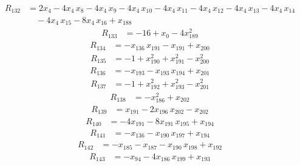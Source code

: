 \begin{align*}
R_{132} &= 2x_{4} -4x_{4}\,x_{8} -4x_{4}\,x_{9} -4x_{4}\,x_{10} -4x_{4}\,x_{11} -4x_{4}\,x_{12} -4x_{4}\,x_{13} -4x_{4}\,x_{14} \\
&\quad {} -4x_{4}\,x_{15} -8x_{4}\,x_{16} +x_{188}
\end{align*}
\begin{align*}
R_{133} &= -16 +x_{0} -4x_{189}^{2}
\end{align*}
\begin{align*}
R_{134} &= -x_{136}\,x_{191} -x_{191} +x_{200}
\end{align*}
\begin{align*}
R_{135} &= -1 +x_{190}^{2} +x_{191}^{2} -x_{200}^{2}
\end{align*}
\begin{align*}
R_{136} &= -x_{193} -x_{193}\,x_{194} +x_{201}
\end{align*}
\begin{align*}
R_{137} &= -1 +x_{192}^{2} +x_{193}^{2} -x_{201}^{2}
\end{align*}
\begin{align*}
R_{138} &= -x_{186}^{2} +x_{202}
\end{align*}
\begin{align*}
R_{139} &= x_{191} -2x_{196}\,x_{202} -x_{202}
\end{align*}
\begin{align*}
R_{140} &= -4x_{191} -8x_{191}\,x_{195} +x_{194}
\end{align*}
\begin{align*}
R_{141} &= -x_{136} -x_{190}\,x_{197} +x_{194}
\end{align*}
\begin{align*}
R_{142} &= -x_{185} -x_{187} -x_{190}\,x_{198} +x_{192}
\end{align*}
\begin{align*}
R_{143} &= -x_{94} -4x_{186}\,x_{199} +x_{193}
\end{align*}
